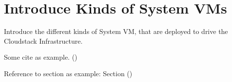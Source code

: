 \section{Introduce Kinds of System VMs} 
Introduce the different kinds of System VM, that are deployed to drive the Cloudstack Infrastructure.

Some cite as example. (\cite{XenServer65UserGuide})

Reference to section as example: Section  ()
